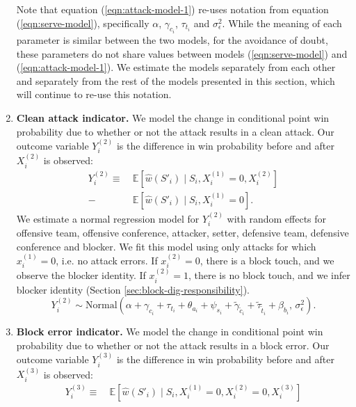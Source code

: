 \documentclass[USenglish]{article}
\theoremstyle{dgthm}
\theoremstyle{dgdef}
\begin{document}
\begin{enumerate}
          Note that equation (\ref{eqn:attack-model-1}) re-uses notation from equation (\ref{eqn:serve-model}), specifically $\alpha$, $\gamma_{c_i}$, $\tau_{t_i}$ and $\sigma^2_\epsilon$. While the meaning of each parameter is similar between the two models, for the avoidance of doubt, these parameters do not share values between models (\ref{eqn:serve-model}) and (\ref{eqn:attack-model-1}). We estimate the models separately from each other and separately from the rest of the models presented in this section, which will continue to re-use this notation.
    \item
        {\bf Clean attack indicator.} We model the change in conditional point win probability due to whether or not the attack results in a clean attack. Our outcome variable $Y_i^{(2)}$ is the difference in win probability before and after $X_i^{(2)}$ is observed:
        \begin{align*}
            Y_i^{(2)} \equiv &~\mathbb{E}\left[\hat w(S'_i) \mid S_i, X_i^{(1)} = 0, X_i^{(2)}\right]\\
            - &~\mathbb{E}\left[\hat w(S'_i) \mid S_i, X_i^{(1)} = 0\right].
        \end{align*}
        We estimate a normal regression model for $Y_i^{(2)}$ with random effects for offensive team, offensive conference, attacker, setter, defensive team, defensive conference and blocker. We fit this model using only attacks for which $x_i^{(1)} = 0$, i.e. no attack errors. If $x_i^{(2)} = 0$, there is a block touch, and we observe the blocker identity. If $x_i^{(2)} = 1$, there is no block touch, and we infer blocker identity (Section \ref{sec:block-dig-responsibility}).
        \begin{equation}
        \label{eqn:attack-model-2}
            Y_i^{(2)} \sim \mbox{Normal}\left(
                \alpha + \gamma_{c_i} + \tau_{t_i} + \theta_{a_i} + \psi_{s_i} + \tilde\gamma_{\tilde c_i} + \tilde\tau_{\tilde t_i} + \beta_{b_i},\,
                \sigma^2_\epsilon
            \right).
        \end{equation}
    \item
        {\bf Block error indicator.} We model the change in conditional point win probability due to whether or not the attack results in a block error. Our outcome variable $Y_i^{(3)}$ is the difference in win probability before and after $X_i^{(3)}$ is observed:
        \begin{align*}
            Y_i^{(3)} \equiv &~\mathbb{E}\left[\hat w(S'_i) \mid S_i, X_i^{(1)} = 0, X_i^{(2)} = 0, X_i^{(3)}\right]\\

\end{align*}
\end{enumerate}
\end{document}
